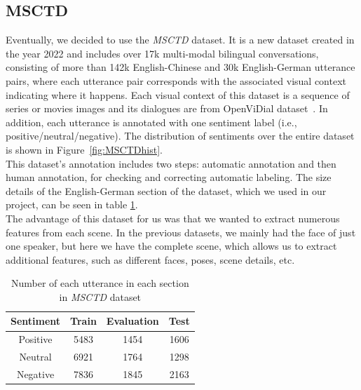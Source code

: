 \subsection{MSCTD}
Eventually, we decided to use the \textit{MSCTD} dataset. It is a new dataset created in the year 2022 and includes over 17k multi-modal bilingual conversations, consisting of more than 142k English-Chinese and 30k English-German utterance pairs, where each utterance pair corresponds with the associated visual context indicating where it happens. Each visual context of this dataset is a sequence of series or movies images and its dialogues are from OpenViDial dataset~\cite{meng2020openvidial}. In addition, each utterance is annotated with one sentiment label (i.e., positive/neutral/negative). The distribution of sentiments over the entire dataset is shown in Figure~\ref{fig:MSCTDhist}.
\\
This dataset's annotation includes two steps: automatic annotation and then human annotation, for checking and correcting automatic labeling. The size details of the English-German section of the dataset, which we used in our project, can be seen in table \ref{table:MSCTD}.
\\
The advantage of this dataset for us was that we wanted to extract numerous features from each scene. In the previous datasets, we mainly had the face of just one speaker, but here we have the complete scene, which allows us to extract additional features, such as different faces, poses, scene details, etc.

\begin{center}
	\begin{table}[h!]
		\begin{tabular}{||c| c c c||} 
			\hline
			Sentiment & Train & Evaluation & Test \\ [0.5ex] 
			\hline\hline
			Positive & 5483 & 1454 & 1606 \\
			\hline
			Neutral & 6921 & 1764 & 1298 \\
			\hline
			Negative & 7836 & 1845 & 2163 \\ [1ex] 
			\hline
		\end{tabular}
	\caption{Number of each utterance in each section in \textit{MSCTD} dataset}
	\label{table:MSCTD}
	\end{table}
\end{center}


